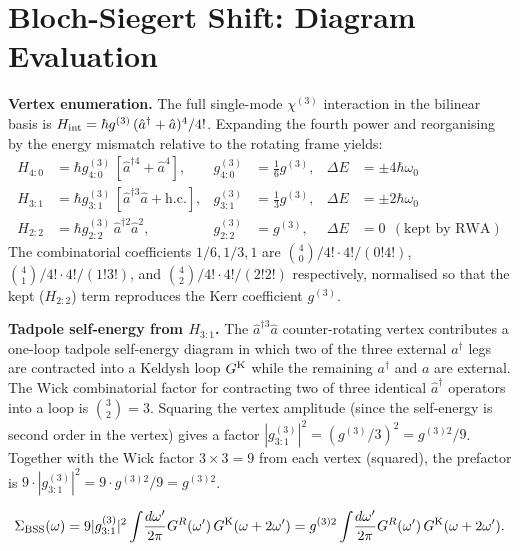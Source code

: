 \documentclass[12pt]{article}
\newcommand{\Keldysh}{{\rm K}}
\newcommand{\BSS}{{\rm BSS}}
\begin{document}
\section{Bloch-Siegert Shift: Diagram Evaluation}
\label{app:bss}

\textbf{Vertex enumeration.} The full single-mode $\chi^{(3)}$
interaction in the bilinear basis is
$H_{\rm int}=\hbar g^{(3)}\,(\hat{a}^\dagger+\hat{a})^4/4!$.
Expanding the fourth power and reorganising by the energy mismatch
relative to the rotating frame yields:
\begin{align}
  H_{4:0} &= \hbar g^{(3)}_{4:0}\,[\hat a^{\dagger 4}+\hat a^4],
    & g^{(3)}_{4:0}&=\tfrac{1}{6}g^{(3)},
    & \Delta E &= \pm 4\hbar\omega_0
    \\
  H_{3:1} &= \hbar g^{(3)}_{3:1}\,[\hat a^{\dagger 3}\hat a+\mathrm{h.c.}],
    & g^{(3)}_{3:1}&=\tfrac{1}{3}g^{(3)},
    & \Delta E &= \pm 2\hbar\omega_0
    \\
  H_{2:2} &= \hbar g^{(3)}_{2:2}\,\hat a^{\dagger 2}\hat a^2,
    & g^{(3)}_{2:2}&=g^{(3)},
    & \Delta E &= 0~~(\text{kept by RWA})
\end{align}
The combinatorial coefficients $1/6, 1/3, 1$ are
$\binom{4}{0}/4!\cdot 4!/(0!4!)$, $\binom{4}{1}/4!\cdot 4!/(1!3!)$,
and $\binom{4}{2}/4!\cdot 4!/(2!2!)$ respectively, normalised so that
the kept ($H_{2:2}$) term reproduces the Kerr coefficient $g^{(3)}$.

\textbf{Tadpole self-energy from $H_{3:1}$.} The $\hat{a}^{\dagger 3}\hat a$
counter-rotating vertex contributes a one-loop tadpole self-energy
diagram in which two of the three external $a^\dagger$ legs are
contracted into a Keldysh loop $G^\Keldysh$ while the remaining
$a^\dagger$ and $a$ are external.  The Wick combinatorial factor for
contracting two of three identical $\hat a^\dagger$ operators into a
loop is $\binom{3}{2}=3$.  Squaring the vertex amplitude (since the
self-energy is second order in the vertex) gives a factor
$|g^{(3)}_{3:1}|^2 = (g^{(3)}/3)^2 = g^{(3)2}/9$.  Together with the
Wick factor $3\times 3 = 9$ from each vertex (squared), the prefactor
is $9 \cdot |g^{(3)}_{3:1}|^2 = 9 \cdot g^{(3)2}/9 = g^{(3)2}$.

\begin{equation}
  \Sigma_\BSS(\omega) = 9|g^{(3)}_{3:1}|^2\int\!\frac{d\omega'}{2\pi}
  G^R(\omega')\,G^\Keldysh(\omega+2\omega')
  = g^{(3)2}\int\!\frac{d\omega'}{2\pi}
  G^R(\omega')\,G^\Keldysh(\omega+2\omega').
  \label{eq:bss_self_energy}
\end{equation}
\end{document}
